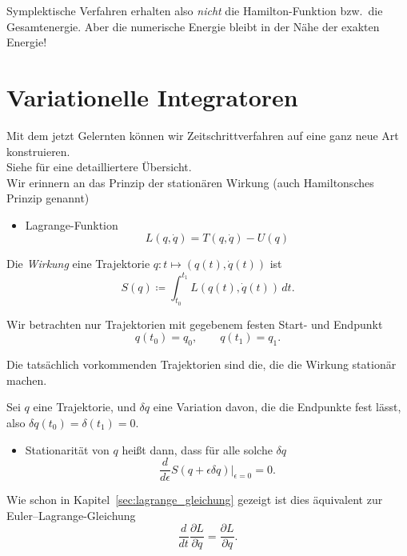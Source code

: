 Symplektische Verfahren erhalten also \emph{nicht} die Hamilton-Funktion bzw.\ die Gesamtenergie.
Aber die numerische Energie bleibt \glqq in der Nähe\grqq{} der exakten Energie!



\section{Variationelle Integratoren}

Mit dem jetzt Gelernten können wir Zeitschrittverfahren auf eine ganz neue Art konstruieren.\\
Siehe \citet{marsden_west:2001} für eine detailliertere Übersicht.\\

Wir erinnern an das Prinzip der stationären Wirkung (auch Hamiltonsches Prinzip genannt)
\begin{itemize}
	\item Lagrange-Funktion
	\begin{equation*}
		L(q,\dot q) = T(q,\dot q) - U(q)
	\end{equation*}
\end{itemize}

\begin{definition}
 Die \emph{Wirkung} eine Trajektorie $q\colon t\mapsto (q(t),\dot q(t))$ ist
	\begin{equation*}
		S(q)\coloneqq \int_{t_0}^{t_1} L(q(t),\dot q(t))\,dt.
	\end{equation*}
\end{definition}

\medskip

 Wir betrachten nur Trajektorien mit gegebenem festen Start- und Endpunkt
	\begin{equation*}
		q(t_0) = q_0,\qquad q(t_1) = q_1.
	\end{equation*}

\begin{definition}
Die tatsächlich vorkommenden Trajektorien sind die, die die Wirkung stationär machen.
\end{definition}

Sei $q$ eine Trajektorie, und $\delta q$ eine Variation davon, die die Endpunkte fest lässt, also $\delta q(t_0)=\delta(t_1) = 0$.
\begin{itemize}
	\item Stationarität von $q$ heißt dann, dass für alle solche $\delta q$
	\begin{equation*}
		\frac{d}{d\epsilon} S(q+\epsilon\delta q)\Big\vert_{\epsilon=0} = 0.
	\end{equation*}
\end{itemize}
Wie schon in Kapitel~\ref{sec:lagrange_gleichung} gezeigt ist dies äquivalent zur Euler--Lagrange-Gleichung
\begin{equation*}
	\frac{d}{dt}\frac{\partial L}{\partial \dot q} = \frac{\partial L}{\partial q}.
\end{equation*}

